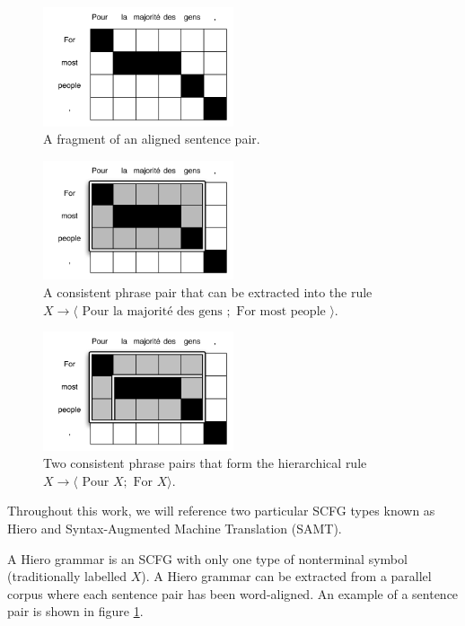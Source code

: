 \documentclass[11pt]{article}
\begin{document}
\begin{figure}[t]
\includegraphics[width=0.5\textwidth]{figures/aligned-sentence}
\caption{A fragment of an aligned sentence pair.\label{aligned-sentence}}
\end{figure}

\begin{figure}[t]
\includegraphics[width=0.5\textwidth]{figures/simple-rule}
\caption{A consistent phrase pair that can be extracted into the rule \\$X \to \langle \textrm{ Pour la majorit\'{e} des gens }; \textrm{ For most people } \rangle$.\label{hiero-rule}}
\end{figure}

\begin{figure}[t]
\includegraphics[width=0.5\textwidth]{figures/hierarchical-rule}
\caption{Two consistent phrase pairs that form the hierarchical rule $X \to \langle \textrm{ Pour } X ; \textrm{ For } X \rangle$.\label{hiero-rule-2}}
\end{figure}

Throughout this work, we will reference two particular SCFG types known as Hiero and Syntax-Augmented Machine Translation (SAMT).

A Hiero grammar \cite{Chiang2007} is an SCFG with only one type of nonterminal symbol (traditionally labelled $X$). A Hiero grammar can be extracted from a parallel corpus where each sentence pair has been word-aligned. An example of a sentence pair is shown in figure \ref{aligned-sentence}.
\end{document}
